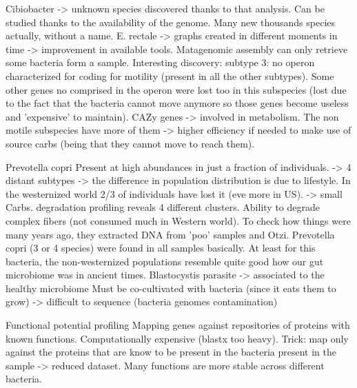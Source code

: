 Cibiobacter -> unknown species discovered thanks to that analysis. Can be studied thanks to the availability of the genome. 
Many new thousands species actually, without a name. 
E. rectale -> graphs created in different moments in time -> improvement in available tools. 
Matagenomic assembly can only retrieve some bacteria form a sample. 
Interesting discovery: subtype 3: no operon characterized for coding for motility (present in all the other subtypes). Some other genes no comprised in the operon were lost too in this subspecies (lost due to the fact that the bacteria cannot move anymore so those genes become useless and 'expensive' to maintain).
CAZy genes -> involved in metabolism. The non motile subspecies have more of them -> higher efficiency if needed to make use of source carbs (being that they cannot move to reach them). 

Prevotella copri 
Present at high abundances in just a fraction of individuals. 
-> 4 distant subtypes
-> the difference in population distribution is due to lifestyle. In the westernized world 2/3 of individuals have lost it (eve more in US). 
-> small %
Carbs. degradation profiling reveals 4 different clusters. Ability to degrade complex fibers (not consumed much in Western world).
To check how things were many years ago, they extracted DNA from 'poo' samples and Otzi. 
Prevotella copri (3 or 4 species) were found in all samples basically.  At least for this bacteria, the non-westernized populations resemble quite good how our gut microbiome was in ancient times. 
Blastocystis 
parasite
-> associated to the healthy microbiome
Must be co-cultivated with bacteria (since it eats them to grow) -> difficult to sequence (bacteria genomes contamination)

Functional potential profiling
Mapping genes against repositories of proteins with known functions. Computationally expensive (blastx too heavy). Trick: map only against the proteins that are know to be present in the bacteria present in the sample -> reduced dataset.
Many functions are more stable across different bacteria.


 